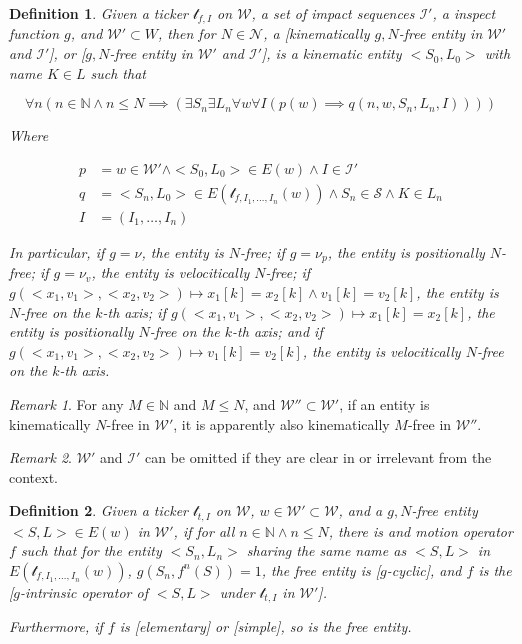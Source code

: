 \documentclass{book}
\newtheorem{definition}{Definition}
\theoremstyle{definition}\newtheorem{mechanism}{Mechanism}
\theoremstyle{remark}\newtheorem*{remark}{Remark}
\begin{document}
\begin{definition}
	Given a ticker $\mathcal t_{f, I}$ on $\mathcal W$, a set of impact sequences $\mathcal I'$, a inspect function $g$, and $\mathcal W'\subset W$, then for $N\in \mathcal N$, a [kinematically $g, N$-free entity in $\mathcal W'$ and $\mathcal I'$], or [$g, N$-free entity in $\mathcal W'$ and $\mathcal I'$], is a kinematic entity $<S_0, L_0>$ with name $K\in L$ such that
	
	\begin{equation*}
		\forall n (n\in\mathbb N\land n \le N\implies(\exists S_n\exists L_n\forall w \forall I(p(w) \implies q(n, w, S_n, L_n, I))))
	\end{equation*}
	
	Where
	
	\begin{align*}
		p &= w\in \mathcal W' \land <S_0, L_0>\in E(w) \land I \in \mathcal I'\\
		q &= <S_n, L_0>\in E(\mathcal t_{f, I_1, \dots, I_n}(w)) \land  S_n\in \mathcal S\land K\in L_n\\
		I &= (I_1, \dots, I_n)
	\end{align*}
	
	In particular, if $g = \nu$, the entity is $N$-free; if $g = \nu_p$, the entity is positionally $N$-free; if $g = \nu_v$, the entity is velocitically $N$-free; if $g(<x_1, v_1>, <x_2, v_2>) \mapsto x_1[k] = x_2[k] \land v_1[k] = v_2[k]$, the entity is $N$-free on the $k$-th axis; if $g(<x_1, v_1>, <x_2, v_2>) \mapsto x_1[k] = x_2[k]$, the entity is positionally $N$-free on the $k$-th axis; and if $g(<x_1, v_1>, <x_2, v_2>) \mapsto v_1[k] = v_2[k]$, the entity is velocitically $N$-free on the $k$-th axis.
\end{definition}

\begin{remark}
	For any $M \in \mathbb N$ and $M \le N$, and $\mathcal W'' \subset \mathcal W'$, if an entity is kinematically $N$-free in $\mathcal W'$, it is apparently also kinematically $M$-free in $\mathcal W''$.
\end{remark}

\begin{remark}
	$\mathcal W'$ and $\mathcal I'$ can be omitted if they are clear in or irrelevant from the context.
\end{remark}

\begin{definition}
	Given a ticker $\mathcal t_{t, I}$ on $\mathcal W$, $w\in \mathcal W'\subset \mathcal W$, and a $g, N$-free entity $<S, L>\in E(w)$ in $\mathcal W'$, if for all $n\in \mathbb N \land n \le N$, there is and motion operator $f$ such that for the entity $<S_n, L_n>$ sharing the same name as $<S, L>$ in $E(\mathcal t_{f, I_1, \dots, I_n}(w))$, $g(S_n, f^n(S)) = 1$, the free entity is [$g$-cyclic], and $f$ is the [$g$-intrinsic operator of $<S, L>$ under $\mathcal t_{t, I}$ in $\mathcal W'$].
	
	Furthermore, if $f$ is [elementary] or [simple], so is the free entity.
\end{definition}
\end{document}
